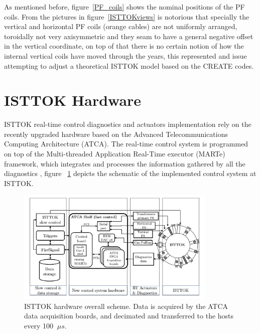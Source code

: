 
As mentioned before, figure~\ref{PF_coils} shows the  nominal positions of the PF coils. From the pictures in figure~\ref{ISTTOKviews} is notorious that specially the vertical and horizontal PF coils (orange cables) are not uniformly arranged, toroidally not very axisymmetric and they seam to have a general negative offset in the vertical coordinate, on top of that there is no certain notion of how the internal vertical coils have moved through the years, this represented and issue  attempting to adjust a theoretical ISTTOK model based on the CREATE codes.\smallskip





\section{ISTTOK Hardware }

ISTTOK real-time control diagnostics and actuators  implementation rely  on the recently upgraded hardware based on the Advanced Telecommunications Computing Architecture (ATCA).   The real-time control system is programmed on top of the Multi-threaded Application Real-Time executor (MARTe) framework,  which  integrates and processes the information gathered by all the  diagnostics \cite{Ivo2}, figure ~\ref{ISTTOK_hard} depicts the schematic of the implemented control system at ISTTOK.

\begin{figure}[htbp]
	\centering
	\includegraphics[width=0.85\textwidth]{Chp4/control_schem_1.PNG}
	\caption{\label{ISTTOK_hard} ISTTOK hardware overall scheme. Data is acquired by the
		ATCA data acquisition boards, and decimated and transferred to the hosts
		every 100 $~\mu s$. }
\end{figure}


